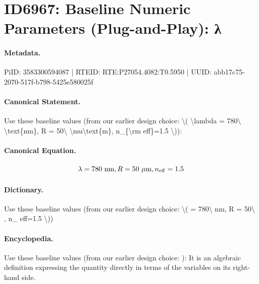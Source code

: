 \section*{ID6967: Baseline Numeric Parameters (Plug-and-Play): λ}
\paragraph{Metadata.}
PiID: 3583300594087 | RTEID: RTE:P27054.4082:T0.5950 | UUID: abb17c75-2070-517f-b798-5425e580025f

\paragraph{Canonical Statement.}
Use these baseline values (from our earlier design choice: \textbackslash{}( \textbackslash{}lambda = 780\textbackslash{} \textbackslash{}text\{nm\}, R = 50\textbackslash{} \textbackslash{}mu\textbackslash{}text\{m\}, n\_\{\textbackslash{}rm eff\}=1.5 \textbackslash{})):

\paragraph{Canonical Equation.}
\[
\lambda = 780\ \text{nm}, R = 50\ \mu\text{m}, n_{\rm eff}=1.5
\]

\paragraph{Dictionary.}
Use these baseline values (from our earlier design choice: \textbackslash{}( = 780\textbackslash{} nm, R = 50\textbackslash{} , n\_ eff=1.5 \textbackslash{}))

\paragraph{Encyclopedia.}
Use these baseline values (from our earlier design choice: ): It is an algebraic definition expressing the quantity directly in terms of the variables on its right-hand side.
